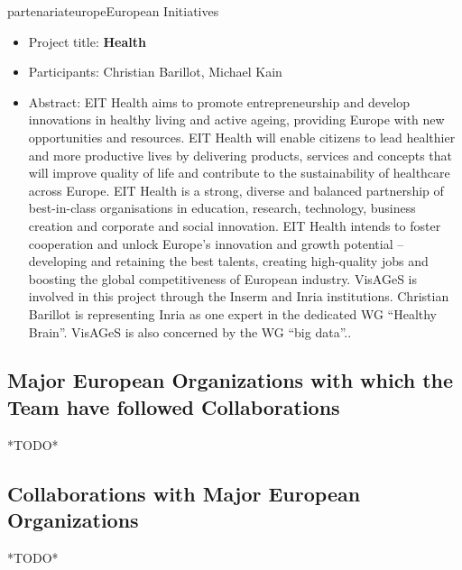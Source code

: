 \documentclass{ra2018}
\begin{document}
\begin{module}{partenariat}{europe}{European Initiatives}
  \begin{itemize}
        \item Project title: \textbf{Health}
        \item Participants: Christian Barillot, Michael Kain
        \item Abstract:  EIT Health aims to promote entrepreneurship and develop innovations in healthy living and active ageing, providing Europe with new opportunities and resources. EIT Health will enable citizens to lead healthier and more productive lives by delivering products, services and concepts that will improve quality of life and contribute to the sustainability of healthcare across Europe. EIT Health is a strong, diverse and balanced partnership of best-in-class organisations in education, research, technology, business creation and corporate and social innovation. EIT Health intends to foster cooperation and unlock Europe’s innovation and growth potential – developing and retaining the best talents, creating high-quality jobs and boosting the global competitiveness of European industry. VisAGeS is involved in this project through the Inserm and Inria institutions. Christian Barillot is representing Inria as one expert in the dedicated WG “Healthy Brain”. VisAGeS is also concerned by the WG “big data”..
\end{itemize}  

\subsection{Major European Organizations with which the Team have followed Collaborations}
*TODO*

\subsection{Collaborations with Major European Organizations}
*TODO*



\end{module}
\end{document}
